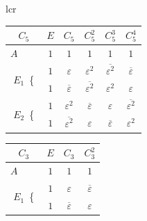 \documentclass[landscape]{article}
\begin{document}
\begin{center}
\begin{tabular}{lcr}
\begin{minipage}[c]{0.3\linewidth}
\begin{center}
                    \begin{tabular}{c|ccccc}
                        $C_{5}$ & $E$ & $C_5$ & $C_5^2$ & $C_5^3$ & $C_5^4$\\
                        \hline
                        $A$~~~~ & $1$ & $1$ & $1$ & $1$ & $1$\\
                        \multirow{2}{*}{$E_1$~\Bigg\{} & $1$ & $\varepsilon$ & $\varepsilon^2$ & $\overline{\varepsilon^2}$ & $\overline{\varepsilon}$\\
                        & $1$ & $\overline{\varepsilon}$ & $\overline{\varepsilon^2}$ & $\varepsilon^2$ & $\varepsilon$\\
                        \multirow{2}{*}{$E_2$~\Bigg\{} & $1$ & $\varepsilon^2$ & $\overline{\varepsilon}$ & $\varepsilon$ & $\overline{\varepsilon^2}$\\
                        & $1$ & $\overline{\varepsilon^2}$ & $\varepsilon$ & $\overline{\varepsilon}$ & $\varepsilon^2$
                    \end{tabular}
                    \vspace{1cm}
                    
                    \begin{tabular}{c|ccc}
                        $C_{3}$ & $E$ & $C_3$ & $C_3^2$\\
                        \hline
                        $A$~~~~ & $1$ & $1$ & $1$\\
                        \multirow{2}{*}{$E_1$~\Bigg\{} & $1$ & $\varepsilon$ & $\overline{\varepsilon}$\\
                        & $1$ & $\overline{\varepsilon}$ & $\varepsilon$
                    \end{tabular}
                \end{center}
            \end{minipage}
        \end{tabular}
    \end{center}
\end{document}

